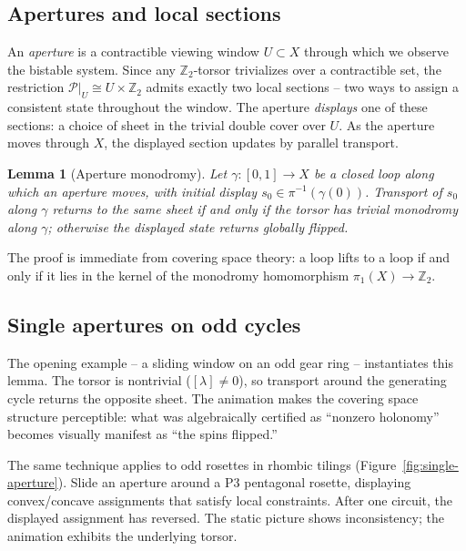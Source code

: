 \documentclass[11pt]{amsart}  %
\theoremstyle{plain}
\newtheorem{lemma}[theorem]{Lemma}
\theoremstyle{definition}
\theoremstyle{remark}
\newcommand{\style}[1]{{\em #1}} %
\newcommand{\torsor}{\mathcal{P}} %
\newcommand{\Z}{\mathbb{Z}} %
\newcommand{\coupling}{\lambda} %
\begin{document}
\subsection{Apertures and local sections}
\label{sec:apertures}

An \style{aperture} is a contractible viewing window $U \subset X$ through which we observe the bistable system. Since any $\Z_2$-torsor trivializes over a contractible set, the restriction $\torsor|_U \cong U \times \Z_2$ admits exactly two local sections -- two ways to assign a consistent state throughout the window. The aperture \style{displays} one of these sections: a choice of sheet in the trivial double cover over $U$.
%
As the aperture moves through $X$, the displayed section updates by parallel transport.

\begin{lemma}[Aperture monodromy]
\label{lem:aperture-monodromy}
Let $\gamma: [0,1] \to X$ be a closed loop along which an aperture moves, with initial display $s_0 \in \pi^{-1}(\gamma(0))$. Transport of $s_0$ along $\gamma$ returns to the same sheet if and only if the torsor has trivial monodromy along $\gamma$; otherwise the displayed state returns globally flipped.
\end{lemma}

\noindent
The proof is immediate from covering space theory: a loop lifts to a loop if and only if it lies in the kernel of the monodromy homomorphism $\pi_1(X) \to \Z_2$.

\subsection{Single apertures on odd cycles}
\label{sec:single-odd}

The opening example -- a sliding window on an odd gear ring -- instantiates this lemma. The torsor is nontrivial ($[\coupling] \neq 0$), so transport around the generating cycle returns the opposite sheet. The animation makes the covering space structure perceptible: what was algebraically certified as ``nonzero holonomy'' becomes visually manifest as ``the spins flipped.''

The same technique applies to odd rosettes in rhombic tilings (Figure~\ref{fig:single-aperture}). Slide an aperture around a P3 pentagonal rosette, displaying convex/concave assignments that satisfy local constraints. After one circuit, the displayed assignment has reversed. The static picture shows inconsistency; the animation exhibits the underlying torsor.
\end{document}
